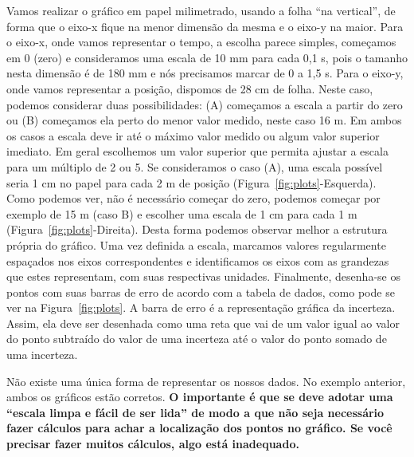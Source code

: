 Vamos realizar o gráfico em papel milimetrado, usando a folha ``na vertical'', de forma que o eixo-x fique na menor dimensão da mesma e o eixo-y na maior. Para o eixo-x, onde vamos representar o tempo, a escolha parece simples, começamos em 0 (zero) e consideramos uma escala de 10 mm para cada 0,1 s, pois o tamanho nesta dimensão é de 180 mm e nós precisamos marcar de 0 a 1,5 s. Para o eixo-y, onde vamos representar a posição, dispomos de 28 cm de folha. Neste caso, podemos considerar duas possibilidades: (A) começamos a escala a partir do zero ou (B) começamos ela perto do menor valor medido, neste caso 16 m.  Em ambos  os casos a escala deve ir até o máximo valor medido ou algum valor superior imediato.  Em geral escolhemos um valor superior que permita ajustar a escala para um múltiplo de 2 ou 5. Se consideramos o caso (A), uma escala possível seria 1 cm no papel para cada 2 m de posição (Figura~\ref{fig:plots}-Esquerda). Como podemos ver, não é necessário começar do zero, podemos começar por exemplo de 15 m (caso B) e escolher uma escala de 1 cm para cada 1 m (Figura~\ref{fig:plots}-Direita). Desta forma podemos observar melhor a estrutura própria do gráfico. Uma vez definida a escala, marcamos valores regularmente espaçados nos eixos correspondentes e identificamos os eixos com as grandezas que estes representam, com suas respectivas unidades. Finalmente, desenha-se os  pontos com suas barras de erro de acordo com a tabela de dados, como pode se ver na Figura~\ref{fig:plots}. A barra de erro é a representação gráfica da incerteza. Assim, ela deve ser desenhada como uma reta que vai de um valor igual ao valor do ponto subtraído do valor de uma incerteza até o valor do ponto somado de uma incerteza.

Não existe uma única forma de representar os nossos dados.  No exemplo anterior, ambos os gráficos estão corretos. {\bf O importante é que se deve adotar uma “escala limpa e fácil de ser lida” de modo a que não seja necessário fazer cálculos para achar a localização dos pontos no gráfico. Se você precisar fazer muitos cálculos, algo está inadequado.}

